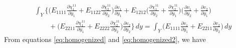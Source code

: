 \documentclass[10pt]{article}
\begin{document}
\begin{equation}
\label{eq:homogenized2}
\begin{split}
&\int_Y \bigg \{\bigg ( E_{1111}\frac{\partial \chi^{11}_1}{\partial y_1} + E_{1122}\frac{\partial \chi^{11}_2}{\partial y_2}\bigg )\frac{\partial v_1}{\partial y_1} + E_{1212}\bigg (\frac{\partial \chi^{11}_1}{\partial y_2} + \frac{\partial \chi^{11}_2}{\partial y_1}\bigg )\bigg (\frac{\partial v_1}{\partial y_2} +\frac{\partial v_2}{\partial y_1}\bigg )\\
&\qquad + \bigg (E_{2211}\frac{\partial \chi^{11}_1}{\partial y_1} + E_{2222}\frac{\partial \chi^{11}_2}{\partial y_2}\bigg )\frac{\partial v_2}{\partial y_2}\bigg \}\,dy = \int_Y\bigg (E_{1111}\frac{\partial v_1}{\partial y_1}+E_{2211}\frac{\partial v_2}{\partial y_2}\bigg )\, dy
\end{split}
\end{equation}
From equations \eqref{eq:homogenized} and \eqref{eq:homogenized2}, we have
\end{document}
